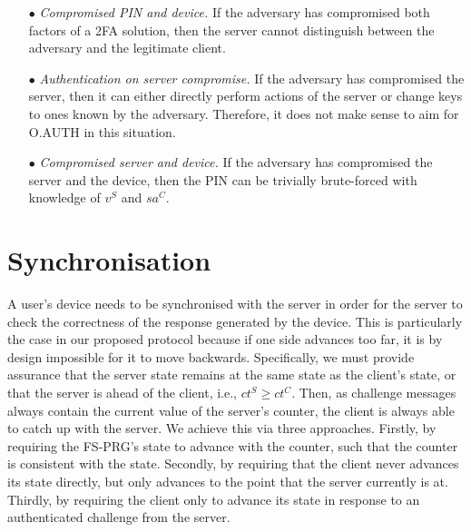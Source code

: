 \documentclass[runningheads]{llncs}
\newcommand{\sss}{\scriptscriptstyle}
\newcommand{\counter}{\ensuremath{{ct}}}
\newcommand{\salt}{\ensuremath{{sa}}}
\renewcommand{\verifier}{\ensuremath{{v}}}
\newcommand{\VC}[1]{\ensuremath{#1^{\sss C}}}
\newcommand{\VS}[1]{\ensuremath{#1^{\sss S}}}
\begin{document}
\begin{itemize}
\item[$\bullet$]\textit{Compromised PIN and device.}
If the adversary has compromised both factors of a 2FA solution, then the server cannot distinguish between the adversary and the legitimate client.

\item[$\bullet$]\textit{Authentication on server compromise.}
If the adversary has compromised the server, then it can either directly perform actions of the server or change keys to ones known by the adversary. Therefore, it does not make sense to aim for O.AUTH in this situation.

\item[$\bullet$]\textit{Compromised server and device.}
If the adversary has compromised the server and the device, then the PIN can be trivially brute-forced with knowledge of \VS{\verifier} and \VC{\salt}. %
\end{itemize}


\section{Synchronisation}
\label{sec:synchronisation}

A user's device needs to be synchronised with the server
in order for the server to check the correctness of the response generated by the device.
This is particularly the case in our proposed protocol because
if one side advances too far, it is by design impossible for it to
move backwards. Specifically, we must provide assurance that the server state remains at the same state as the client's state, or that the server is ahead of the client, i.e., $\VS{\counter} \geq \VC{\counter}$. Then, as challenge messages always contain the current value of the server's counter, the client is always able to catch up with the server. We achieve this via three approaches.  Firstly, by requiring the FS-PRG's state to advance with the counter, such that the counter is consistent with the state. Secondly, by requiring that the client never advances its state directly, but only advances to the point that the server currently is at. Thirdly, by requiring the client only to advance its state in response to an authenticated challenge from the server.%
\end{document}

